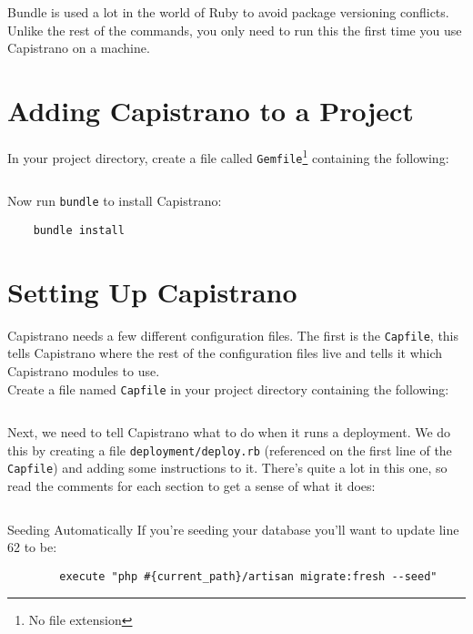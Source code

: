 Bundle is used a lot in the world of Ruby to avoid package versioning conflicts. Unlike the rest of the commands, you only need to run this the first time you use Capistrano on a machine.


\section{Adding Capistrano to a Project}

In your project directory, create a file called \texttt{Gemfile}\footnote{No file extension} containing the following:

\inputminted{ruby}{20-capistrano/figures/01-Gemfile}

Now run \texttt{bundle} to install Capistrano:

\begin{verbatim}
    bundle install
\end{verbatim}


\section{Setting Up Capistrano}

Capistrano needs a few different configuration files. The first is the \texttt{Capfile}, this tells Capistrano where the rest of the configuration files live and tells it which Capistrano modules to use.
\\

Create a file named \texttt{Capfile} in your project directory containing the following:

\inputminted{ruby}{20-capistrano/figures/02-Capfile}

Next, we need to tell Capistrano what to do when it runs a deployment. We do this by creating a file \texttt{deployment/deploy.rb} (referenced on the first line of the \texttt{Capfile}) and adding some instructions to it. There's quite a lot in this one, so read the comments for each section to get a sense of what it does:

\inputminted{ruby}{20-capistrano/figures/03-deploy.rb}

\begin{infobox}{Seeding Automatically}
    If you're seeding your database you'll want to update line 62 to be:

    \begin{verbatim}
        execute "php #{current_path}/artisan migrate:fresh --seed"
    \end{verbatim}
\end{infobox}


